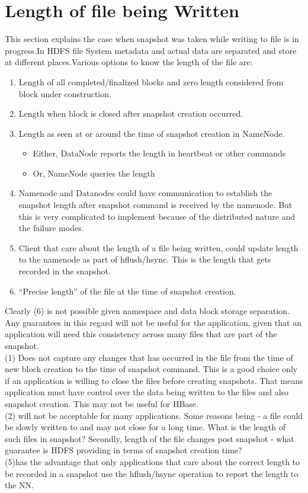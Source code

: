\section{Length of file being Written}
This section explains the case when snapshot was taken while writing to file is in progress.In HDFS file System metadata and actual data are separated and store at different places.Various options to know the length of the file are:
\begin{enumerate}
 \item Length of all completed/finalized blocks and zero length considered from block under
construction.
\item Length when block is closed after snapshot creation occurred.
\item Length as seen at or around the time of snapshot creation in NameNode.
\begin{itemize}
 \item Either, DataNode reports the length in heartbeat or other commands
\item  Or, NameNode queries the length
\end{itemize}

\item Namenode and Datanodes could have communication to establish the snapshot length after
snapshot command is received by the namenode. But this is very complicated to implement
because of the distributed nature and the failure modes.
\item Client that care about the length of a file being written, could update length to the namenode as part of hflush/hsync. This is the length that gets recorded in the snapshot.
\item “Precise length” of the file at the time of snapshot creation.

\end{enumerate}

Clearly (6) is not possible given namespace and data block storage separation. Any guarantees in this regard will not be useful for the application, given that an application will need this consistency across many files that are part of the snapshot. \\
(1) Does not capture any changes that has occurred in the file from the time of new
block creation to the time of snapshot command. This is a good choice only if an application is willing to close the files before creating snapshots. That means application must have control over the data being written to the files and also snapshot creation. This may not be useful for HBase.\\
(2) will not be acceptable for many applications. Some reasons being - a file could be slowly written to and may not close for a long time. What is the length of such files in snapshot? Secondly, length of the file changes post snapshot - what guarantee is HDFS providing in terms of snapshot creation time?\\
(5)has the advantage that only applications that care about the correct length to be recorded in a snapshot use the hflush/hsync operation to report the length to the NN.

